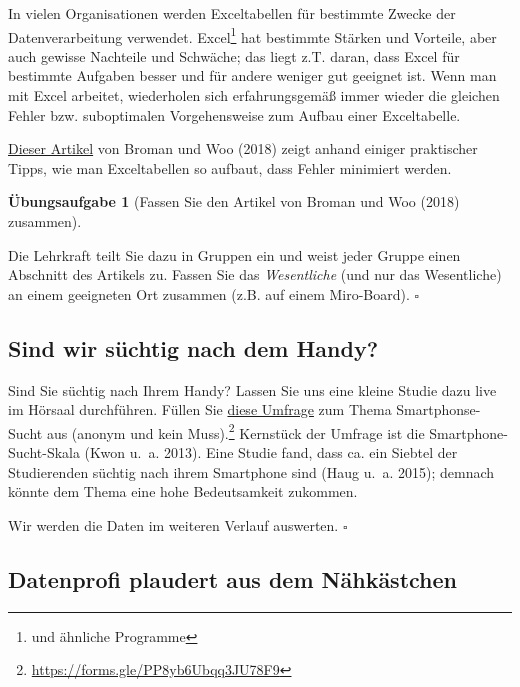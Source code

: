 \documentclass[
  a4paper,
  DIV=11]{scrreprt}
\theoremstyle{definition}
\newtheorem{exercise}{Übungsaufgabe}[chapter]
\theoremstyle{definition}
\theoremstyle{definition}
\theoremstyle{remark}
\begin{document}
In vielen Organisationen werden Exceltabellen für bestimmte Zwecke der
Datenverarbeitung verwendet. Excel\footnote{und ähnliche Programme} hat
bestimmte Stärken und Vorteile, aber auch gewisse Nachteile und
Schwäche; das liegt z.T. daran, dass Excel für bestimmte Aufgaben besser
und für andere weniger gut geeignet ist. Wenn man mit Excel arbeitet,
wiederholen sich erfahrungsgemäß immer wieder die gleichen Fehler bzw.
suboptimalen Vorgehensweise zum Aufbau einer Exceltabelle.

\href{https://www.tandfonline.com/doi/full/10.1080/00031305.2017.1375989}{Dieser
Artikel} von Broman und Woo (2018) zeigt anhand einiger praktischer
Tipps, wie man Exceltabellen so aufbaut, dass Fehler minimiert werden.

\begin{exercise}[Fassen Sie den Artikel von Broman und Woo (2018)
zusammen]\protect\hypertarget{exr-xls-paper}{}\label{exr-xls-paper}

Die Lehrkraft teilt Sie dazu in Gruppen ein und weist jeder Gruppe einen
Abschnitt des Artikels zu. Fassen Sie das \emph{Wesentliche} (und nur
das Wesentliche) an einem geeigneten Ort zusammen (z.B. auf einem
Miro-Board). \(\square\)

\end{exercise}

\subsection{Sind wir süchtig nach dem
Handy?}\label{sind-wir-suxfcchtig-nach-dem-handy}

Sind Sie süchtig nach Ihrem Handy? Lassen Sie uns eine kleine Studie
dazu live im Hörsaal durchführen. Füllen Sie
\href{https://forms.gle/PP8yb6Ubqq3JU78F9}{diese Umfrage} zum Thema
Smartphonse-Sucht aus (anonym und kein Muss).\footnote{\url{https://forms.gle/PP8yb6Ubqq3JU78F9}}
Kernstück der Umfrage ist die Smartphone-Sucht-Skala (Kwon u.~a. 2013).
Eine Studie fand, dass ca. ein Siebtel der Studierenden süchtig nach
ihrem Smartphone sind (Haug u.~a. 2015); demnach könnte dem Thema eine
hohe Bedeutsamkeit zukommen.

Wir werden die Daten im weiteren Verlauf auswerten. \(\square\)

\subsection{Datenprofi plaudert aus dem
Nähkästchen}\label{datenprofi-plaudert-aus-dem-nuxe4hkuxe4stchen}
\end{document}
